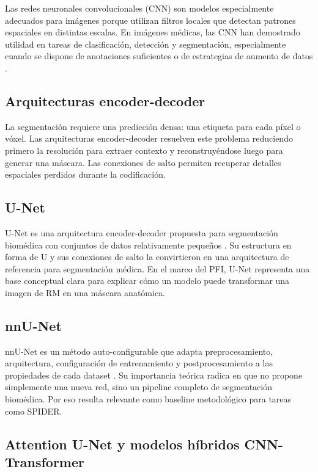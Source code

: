 Las redes neuronales convolucionales (CNN) son modelos especialmente adecuados para imágenes porque utilizan filtros locales que detectan patrones espaciales en distintas escalas. En imágenes médicas, las CNN han demostrado utilidad en tareas de clasificación, detección y segmentación, especialmente cuando se dispone de anotaciones suficientes o de estrategias de aumento de datos \parencite{lecun_deep_learning_2015,litjens_survey_2017}.

\subsection{Arquitecturas encoder-decoder}

La segmentación requiere una predicción densa: una etiqueta para cada píxel o vóxel. Las arquitecturas encoder-decoder resuelven este problema reduciendo primero la resolución para extraer contexto y reconstruyéndose luego para generar una máscara. Las conexiones de salto permiten recuperar detalles espaciales perdidos durante la codificación.

\subsection{U-Net}

U-Net es una arquitectura encoder-decoder propuesta para segmentación biomédica con conjuntos de datos relativamente pequeños \parencite{ronneberger_unet_2015}. Su estructura en forma de U y sus conexiones de salto la convirtieron en una arquitectura de referencia para segmentación médica. En el marco del PFI, U-Net representa una base conceptual clara para explicar cómo un modelo puede transformar una imagen de RM en una máscara anatómica.

\subsection{nnU-Net}

nnU-Net es un método auto-configurable que adapta preprocesamiento, arquitectura, configuración de entrenamiento y postprocesamiento a las propiedades de cada dataset \parencite{isensee_nnunet_2021}. Su importancia teórica radica en que no propone simplemente una nueva red, sino un pipeline completo de segmentación biomédica. Por eso resulta relevante como baseline metodológico para tareas como SPIDER.

\subsection{Attention U-Net y modelos híbridos CNN-Transformer}

